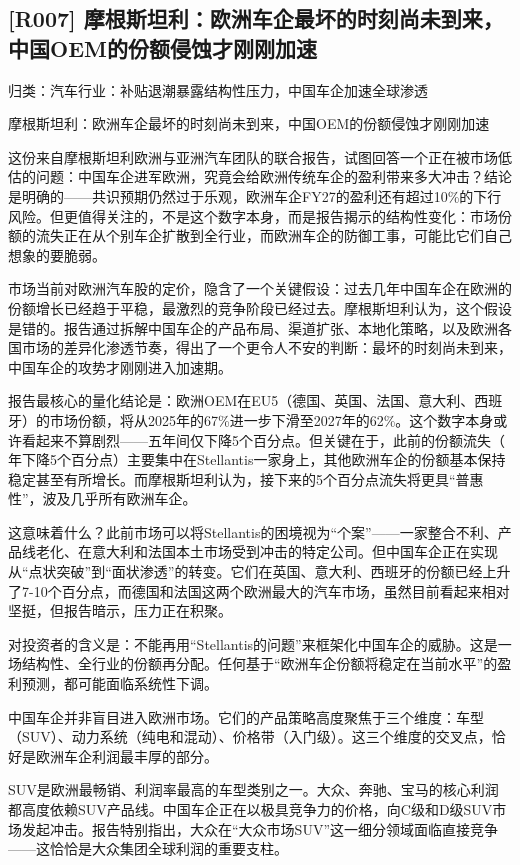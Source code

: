 \documentclass[11pt]{ctexart}
\begin{document}
\subsection{[R007] 摩根斯坦利：欧洲车企最坏的时刻尚未到来，中国OEM的份额侵蚀才刚刚加速}
{\small\color{refgray}归类：汽车行业：补贴退潮暴露结构性压力，中国车企加速全球渗透}

摩根斯坦利：欧洲车企最坏的时刻尚未到来，中国OEM的份额侵蚀才刚刚加速

这份来自摩根斯坦利欧洲与亚洲汽车团队的联合报告，试图回答一个正在被市场低估的问题：中国车企进军欧洲，究竟会给欧洲传统车企的盈利带来多大冲击？结论是明确的——共识预期仍然过于乐观，欧洲车企FY27的盈利还有超过10\%的下行风险。但更值得关注的，不是这个数字本身，而是报告揭示的结构性变化：市场份额的流失正在从个别车企扩散到全行业，而欧洲车企的防御工事，可能比它们自己想象的要脆弱。

市场当前对欧洲汽车股的定价，隐含了一个关键假设：过去几年中国车企在欧洲的份额增长已经趋于平稳，最激烈的竞争阶段已经过去。摩根斯坦利认为，这个假设是错的。报告通过拆解中国车企的产品布局、渠道扩张、本地化策略，以及欧洲各国市场的差异化渗透节奏，得出了一个更令人不安的判断：最坏的时刻尚未到来，中国车企的攻势才刚刚进入加速期。

报告最核心的量化结论是：欧洲OEM在EU5（德国、英国、法国、意大利、西班牙）的市场份额，将从2025年的67\%进一步下滑至2027年的62\%。这个数字本身或许看起来不算剧烈——五年间仅下降5个百分点。但关键在于，此前的份额流失（ 年下降5个百分点）主要集中在Stellantis一家身上，其他欧洲车企的份额基本保持稳定甚至有所增长。而摩根斯坦利认为，接下来的5个百分点流失将更具“普惠性”，波及几乎所有欧洲车企。

这意味着什么？此前市场可以将Stellantis的困境视为“个案”——一家整合不利、产品线老化、在意大利和法国本土市场受到冲击的特定公司。但中国车企正在实现从“点状突破”到“面状渗透”的转变。它们在英国、意大利、西班牙的份额已经上升了7-10个百分点，而德国和法国这两个欧洲最大的汽车市场，虽然目前看起来相对坚挺，但报告暗示，压力正在积聚。

对投资者的含义是：不能再用“Stellantis的问题”来框架化中国车企的威胁。这是一场结构性、全行业的份额再分配。任何基于“欧洲车企份额将稳定在当前水平”的盈利预测，都可能面临系统性下调。

中国车企并非盲目进入欧洲市场。它们的产品策略高度聚焦于三个维度：车型（SUV）、动力系统（纯电和混动）、价格带（入门级）。这三个维度的交叉点，恰好是欧洲车企利润最丰厚的部分。

SUV是欧洲最畅销、利润率最高的车型类别之一。大众、奔驰、宝马的核心利润都高度依赖SUV产品线。中国车企正在以极具竞争力的价格，向C级和D级SUV市场发起冲击。报告特别指出，大众在“大众市场SUV”这一细分领域面临直接竞争——这恰恰是大众集团全球利润的重要支柱。
\end{document}
